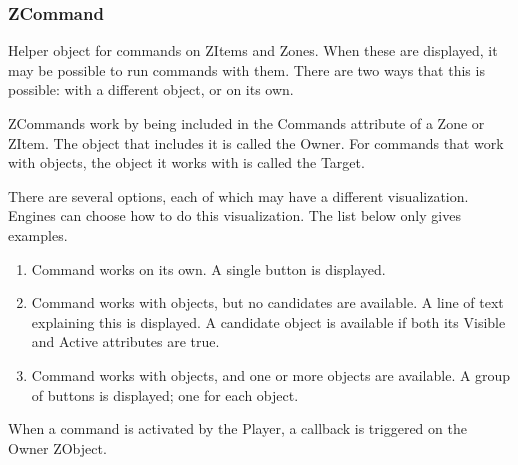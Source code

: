 \documentclass{article}
\begin{document}
\subsubsection{ZCommand}
Helper object for commands on ZItems and Zones. When these are displayed, it may
be possible to run commands with them. There are two ways that this is
possible: with a different object, or on its own.

ZCommands work by being included in the Commands attribute of a Zone or ZItem.
The object that includes it is called the Owner. For commands that work with
objects, the object it works with is called the Target.

There are several options, each of which may have a different visualization.
Engines can choose how to do this visualization. The list below only gives
examples.

\begin{enumerate}
	\item Command works on its own. A single button is displayed.
	\item Command works with objects, but no candidates are available. A line of text explaining this is displayed. A candidate object is available if both its Visible and Active attributes are true.
	\item Command works with objects, and one or more objects are available. A group of buttons is displayed; one for each object.
\end{enumerate}

When a command is activated by the Player, a callback is triggered on the Owner
ZObject.

\end{document}
